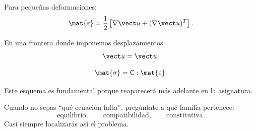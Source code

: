 Para pequeñas deformaciones:
\[
\mat{\varepsilon}
=\frac12\left[\nabla\vect u+(\nabla\vect u)^T\right].
\]

En una frontera donde imponemos desplazamientos:
\[
\vect u=\bar{\vect u}.
\]

\[
\mat{\sigma}=\mathsf{C}:\mat{\varepsilon}.
\]


Este esquema es fundamental porque reaparecerá más adelante en la asignatura.

\begin{tip}
Cuando no sepas ``qué ecuación falta'', pregúntate a qué familia pertenece:
\[
\text{equilibrio},\qquad\text{compatibilidad},\qquad\text{constitutiva}.
\]
Casi siempre localizarás así el problema.
\end{tip}

